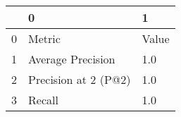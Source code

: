 \begin{tabular}{lll}
\toprule
{} &                       0 &      1 \\
\midrule
0 &                  Metric &  Value \\
1 &       Average Precision &    1.0 \\
2 &  Precision at 2 (P@2) &     1.0 \\
3 &                  Recall &    1.0 \\
\bottomrule
\end{tabular}
